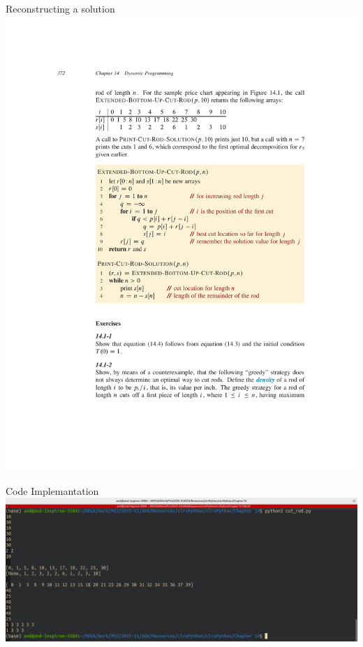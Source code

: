 \documentclass[aspectratio=169]{beamer}
\begin{document}
\begin{frame}{Reconstructing a solution}
    \centering
    \includegraphics[width=\textwidth,clip=true,trim=5cm 13cm 3cm 9cm]{figures/p372}
\end{frame}

\begin{frame}{Code Implemantation}
    \centering
    \includegraphics[width=\textwidth]{figures/implementation}
\end{frame}
\end{document}
